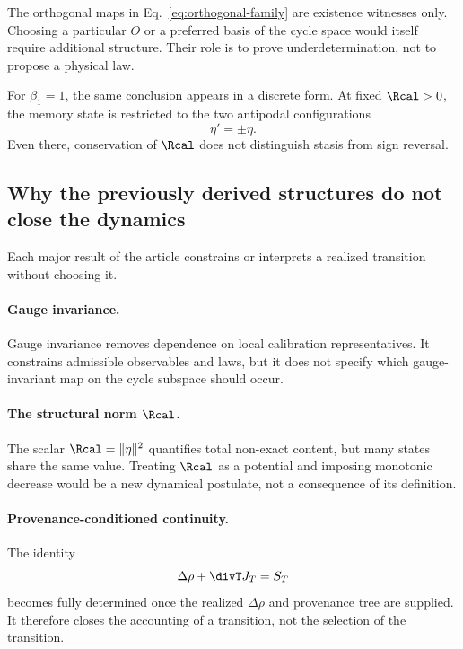 The orthogonal maps in Eq.~\eqref{eq:orthogonal-family} are existence witnesses only. Choosing a particular $O$ or a preferred basis of the cycle space would itself require additional structure. Their role is to prove underdetermination, not to propose a physical law.

For $\beta_1=1$, the same conclusion appears in a discrete form. At fixed $\Rcal>0$, the memory state is restricted to the two antipodal configurations
\begin{equation}
\eta' = \pm\eta.
\end{equation}
Even there, conservation of $\Rcal$ does not distinguish stasis from sign reversal.

\subsection{Why the previously derived structures do not close the dynamics}

Each major result of the article constrains or interprets a realized transition without choosing it.

\paragraph*{Gauge invariance.}
Gauge invariance removes dependence on local calibration representatives. It constrains admissible observables and laws, but it does not specify which gauge-invariant map on the cycle subspace should occur.

\paragraph*{The structural norm $\Rcal$.}
The scalar $\Rcal=\|\eta\|^2$ quantifies total non-exact content, but many states share the same value. Treating $\Rcal$ as a potential and imposing monotonic decrease would be a new dynamical postulate, not a consequence of its definition.

\paragraph*{Provenance-conditioned continuity.}
The identity
\begin{equation}
\Delta\rho+\divT J_T=S_T
\end{equation}
becomes fully determined once the realized $\Delta\rho$ and provenance tree are supplied. It therefore closes the accounting of a transition, not the selection of the transition.

